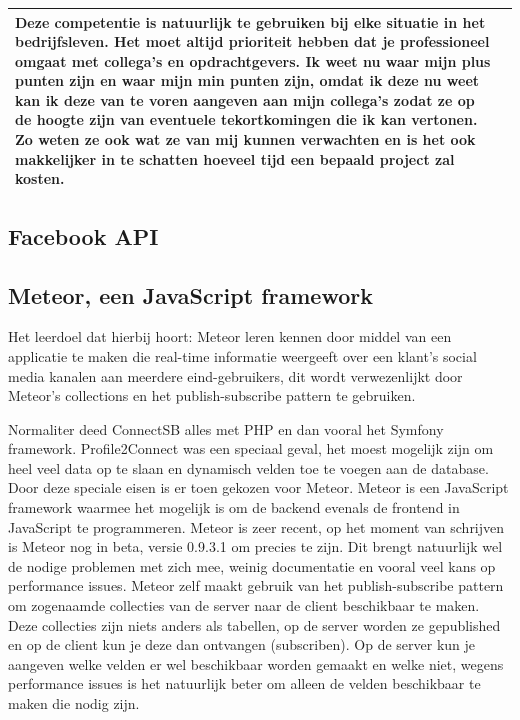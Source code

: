\begin{tabularx}{\textwidth}{| l | X |}
\newline
\newline
Deze competentie is natuurlijk te gebruiken bij elke situatie in het bedrijfsleven. Het moet altijd prioriteit hebben dat je professioneel omgaat met collega's en opdrachtgevers. Ik weet nu waar mijn plus punten zijn en waar mijn min punten zijn, omdat ik deze nu weet kan ik deze van te voren aangeven aan mijn collega's zodat ze op de hoogte zijn van eventuele tekortkomingen die ik kan vertonen. Zo weten ze ook wat ze van mij kunnen verwachten en is het ook makkelijker in te schatten hoeveel tijd een bepaald project zal kosten.
\\
\hline
\end{tabularx}

\subsection{Facebook API}

\clearpage

\subsection{Meteor, een JavaScript framework}
Het leerdoel dat hierbij hoort: Meteor leren kennen door middel van een applicatie te maken die real-time informatie weergeeft over een klant’s social media kanalen aan meerdere eind-gebruikers, dit wordt verwezenlijkt door Meteor’s collections en het publish-subscribe pattern te gebruiken.

Normaliter deed ConnectSB alles met PHP en dan vooral het Symfony framework. Profile2Connect was een speciaal geval, het moest mogelijk zijn om heel veel data op te slaan en dynamisch velden toe te voegen aan de database. Door deze speciale eisen is er toen gekozen voor Meteor. Meteor is een JavaScript framework waarmee het mogelijk is om de backend evenals de frontend in JavaScript te programmeren. Meteor is zeer recent, op het moment van schrijven is Meteor nog in beta, versie 0.9.3.1 om precies te zijn. Dit brengt natuurlijk wel de nodige problemen met zich mee, weinig documentatie en vooral veel kans op performance issues. Meteor zelf maakt gebruik van het publish-subscribe pattern om zogenaamde collecties van de server naar de client beschikbaar te maken. Deze collecties zijn niets anders als tabellen, op de server worden ze gepublished en op de client kun je deze dan ontvangen (subscriben). Op de server kun je aangeven welke velden er wel beschikbaar worden gemaakt en welke niet, wegens performance issues is het natuurlijk beter om alleen de velden beschikbaar te maken die nodig zijn.

